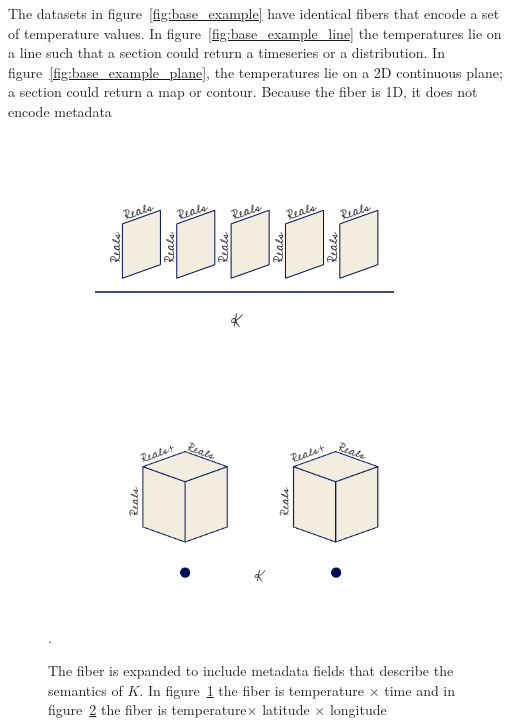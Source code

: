 \documentclass[../main.tex]{subfiles}
\begin{document}
The datasets in figure~\ref{fig:base_example} have identical fibers that encode a set of temperature values. In figure~\ref{fig:base_example_line} the temperatures lie on a line such that a section could return a timeseries or a distribution. In figure~\ref{fig:base_example_plane}, the temperatures lie on a 2D continuous plane; a section could return a map or contour. Because the fiber is 1D, it does not encode metadata 

\begin{figure}[H]
    \begin{subfigure}{.5\textwidth}
        \includegraphics[width=\textwidth]{figures/math/temp_2f.png}
        \label{fig:fiber_example_plane}
    \end{subfigure}
    \begin{subfigure}{.5\textwidth}
        \includegraphics[width=\textwidth]{figures/math/temp_3f.png}
        \label{fig:fiber_example_cube}
    \end{subfigure}
    \label{fig:fiber_example}
    \caption{The fiber is expanded to include metadata fields that describe the semantics of $K$. In figure~\ref{fig:fiber_example_plane} the fiber is \textrm{temperature} $\times$ \textrm{time} and in figure~\ref{fig:fiber_example_cube} the fiber is \textrm{temperature}$\times$ \textrm{latitude} $\times$ {longitude}}.
\end{figure}
\end{document}
